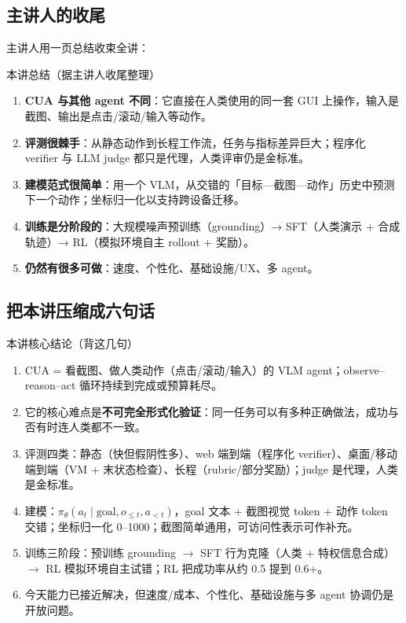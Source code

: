 ﻿\documentclass[a4paper]{article}
\begin{document}
\subsection{主讲人的收尾}

主讲人用一页总结收束全讲：

\begin{importantbox}{本讲总结（据主讲人收尾整理）}
\begin{enumerate}
\item \textbf{CUA 与其他 agent 不同}：它直接在人类使用的同一套 GUI 上操作，输入是截图、输出是点击/滚动/输入等动作。
\item \textbf{评测很棘手}：从静态动作到长程工作流，任务与指标差异巨大；程序化 verifier 与 LLM judge 都只是代理，人类评审仍是金标准。
\item \textbf{建模范式很简单}：用一个 VLM，从交错的「目标—截图—动作」历史中预测下一个动作；坐标归一化以支持跨设备迁移。
\item \textbf{训练是分阶段的}：大规模噪声预训练（grounding）→ SFT（人类演示 + 合成轨迹）→ RL（模拟环境自主 rollout + 奖励）。
\item \textbf{仍然有很多可做}：速度、个性化、基础设施/UX、多 agent。
\end{enumerate}
\end{importantbox}

\subsection{把本讲压缩成六句话}

\begin{importantbox}{本讲核心结论（背这几句）}
\begin{enumerate}
\item CUA = 看截图、做人类动作（点击/滚动/输入）的 VLM agent；observe--reason--act 循环持续到完成或预算耗尽。
\item 它的核心难点是\textbf{不可完全形式化验证}：同一任务可以有多种正确做法，成功与否有时连人类都不一致。
\item 评测四类：静态（快但假阴性多）、web 端到端（程序化 verifier）、桌面/移动端到端（VM + 末状态检查）、长程（rubric/部分奖励）；judge 是代理，人类是金标准。
\item 建模：$\pi_\theta(a_t \mid \text{goal}, o_{\le t}, a_{<t})$，goal 文本 + 截图视觉 token + 动作 token 交错；坐标归一化 0--1000；截图简单通用，可访问性表示可作补充。
\item 训练三阶段：预训练 grounding $\rightarrow$ SFT 行为克隆（人类 + 特权信息合成）$\rightarrow$ RL 模拟环境自主试错；RL 把成功率从约 0.5 提到 0.6+。
\item 今天能力已接近解决，但速度/成本、个性化、基础设施与多 agent 协调仍是开放问题。
\end{enumerate}
\end{importantbox}
\end{document}
